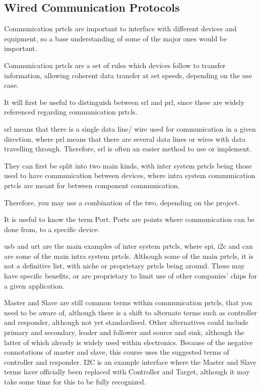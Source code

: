 \documentclass[a4paper,11pt]{report}
\begin{document}
\vspace*{1\baselineskip}

\subsection{Wired Communication Protocols}

Communication \gls{prtcl}s are important to interface with different devices and equipment, so a base understanding of some of the major ones would be important.

Communication \gls{prtcl}s are a set of rules which devices follow to transfer information, allowing coherent data transfer at set speeds, depending on the use case.

It will first be useful to distinguish between \gls{srl} and \gls{prl}, since these are widely referenced regarding communication \gls{prtcl}s.

\gls{srl} means that there is a single data line/ wire used for communication in a given direction, where \gls{prl} means that there are several data lines or wires with data travelling through. Therefore, \gls{srl} is often an easier method to use or implement.

They can first be split into two main kinds, with inter system \gls{prtcl}s being those used to have communication between devices, where intra system communication \gls{prtcl}s are meant for between component communication.

Therefore, you may use a combination of the two, depending on the project.

It is useful to know the term Port. Ports are points where communication can be done from, to a specific device.

\gls{usb} and \gls{urt} are the main examples of inter system \gls{prtcl}s, where \gls{spi}, \gls{i2c} and \gls{can} are some of the main intra system \gls{prtcl}s. Although some of the main \gls{prtcl}s, it is not a definitive list, with niche or proprietary \gls{prtcl}s being around. These may have specific benefits, or are proprietary to limit use of other companies' chips for a given application.

Master and Slave are still common terms within communication \gls{prtcl}s, that you need to be aware of, although there is a shift to alternate terms such as controller and responder, although not yet standardised. Other alternatives could include primary and secondary, leader and follower and source and sink, although the latter of which already is widely used within electronics. Because of the negative connotations of master and slave, this course uses the suggested terms of controller and responder. I2C is an example interface where the Master and Slave terms have officially been replaced with Controller and Target, although it may take some time for this to be fully recognized.
\end{document}
